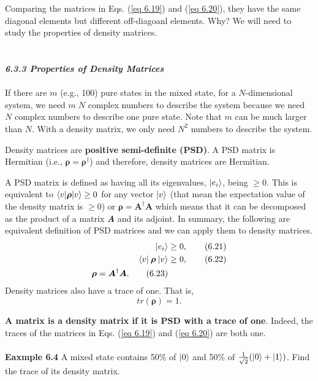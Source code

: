 \documentclass{article}
\newcommand{\bfit}[1]{\textit{\textbf{#1}}}
\begin{document}
Comparing the matrices in Eqs. (\ref{eq 6.19}) and (\ref{eq 6.20}), they have
the same diagonal elements but different off-diagoanl elements. Why? 
We will need to study the properties of density matrices.\\\\\\
\bfit{\large 6.3.3 Properties of Density Matrices}\\\\
If there are $m$ (e.g., 100) pure states in the mixed state, for a $N$-dimensional system,
we need $m \; N$ complex numbers to describe the system because we need $N$ complex
numbers to describe one pure state. Note that $m$ can be much larger than $N$.
With a density matrix, we only need $N^2$ numbers to describe the system.

Density matrices are \textbf{positive semi-definite (PSD)}. A PSD matrix
is Hermitian (i.e., $\boldsymbol{\rho}=\boldsymbol{\rho}^{\dagger}$) and therefore, 
density matrices are Hermitian.

A PSD matrix is defined as having all its eigenvalues, $\ket{e_i}$, being $\geq0$. This is 
equivalent to $\braket{v|\boldsymbol{\rho}|v} \geq 0$ for any vector
$\ket{v}$ (that mean the expectation value of the density matrix is
$\geq0$) or $\boldsymbol{\rho}=\boldsymbol{A}^{\dagger}\boldsymbol{A}$ which means
that it can be decomposed as the product of a matrix \bfit{A} and its adjoint.
In summary, the following are equivalent definition of PSD matrices and we can apply
them to density matrices.
\begin{align} \label{eq 6.21}
    \ket{e_i}&\geq 0,\tag{6.21}\\ 
    \braket{v|\: \boldsymbol{\rho} \: |v}&\geq0,\tag{6.22}\\ 
    \boldsymbol{\rho}=\boldsymbol{A}^{\dagger}\boldsymbol{A}. \tag{6.23}
\end{align}
Density matrices also have a trace of one. That is,
\begin{equation} \label{eq 6.24}
    tr(\boldsymbol{\rho})=1. \tag{6.24}
\end{equation}

\textbf{A matrix is a density matrix if it is PSD with a trace of one}. Indeed, the traces of the matrices in Eqs.
(\ref{eq 6.19}) and (\ref{eq 6.20}) are both one.\\\\
\textbf{Eaxmple 6.4} A mixed state contains 50\% of $\ket{0}$ and 50\% of
$\frac{1}{\sqrt{2}}(\ket{0}+\ket{1})$. Find the trace of its density matrix.
\end{document}
